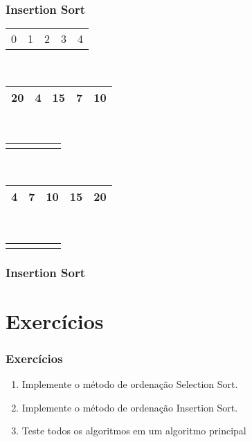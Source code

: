 \documentclass{beamer}
\begin{document}
\begin{frame}
    \frametitle{Insertion Sort}
    \begin{center}
        \begin{table}
            \begin{tabular}{p{0.25cm} p{0.25cm} p{0.25cm} p{0.25cm} p{0.25cm}}
                0 & 1 & 2 & 3 & 4
            \end{tabular} \\
            \begin{tabular}{| p{0.25cm} | p{0.25cm} | p{0.25cm} | p{0.25cm} | p{0.25cm} |}
                \hline
                20 & 4 & 15 & 7 & 10 \\ \hline
            \end{tabular} \\
            \begin{tabular}{p{0.25cm} p{0.25cm} p{0.25cm} p{0.25cm} p{0.25cm}}
                & & & &
            \end{tabular} \\
            \begin{tabular}{| p{0.25cm} | p{0.25cm} | p{0.25cm} | p{0.25cm} | p{0.25cm} |}
                \hline
                4 & 7 & 10 & 15 & 20 \\ \hline
            \end{tabular} \\
            \begin{tabular}{p{0.25cm} p{0.25cm} p{0.25cm} p{0.25cm} p{0.25cm}}
                & & & &
            \end{tabular}
        \end{table}
	\end{center}
    \color{green}{Acabou! Vetor Auxiliar Ordenado!}
\end{frame}

\begin{frame}
	\frametitle{Insertion Sort}
    \centering
    
\end{frame}

\section{Exercícios}

\begin{frame}
    \frametitle{Exercícios}
    \begin{enumerate}
        \item Implemente o método de ordenação Selection Sort.
        \item Implemente o método de ordenação Insertion Sort.
        \item Teste todos os algoritmos em um algoritmo principal
    \end{enumerate}
\end{frame}
\end{document}
